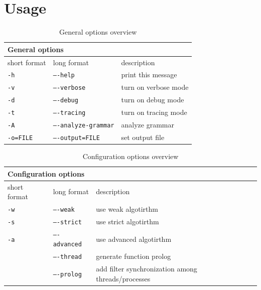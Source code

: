 \section{Usage}

%

\begin{table}[h]
\centering
	\begin{tabular}{||l|l|p{6cm}||}
	\hline
	\multicolumn{3}{||l||}{\textbf{General options}}              \\ \hline\hline
	short format & long format         & description \\ \hline
	\texttt{-h}           & \texttt{----help}              & print this message \\
	\texttt{-v}           & \texttt{----verbose}           & turn on verbose mode \\
	\texttt{-d}           & \texttt{----debug}             & turn on debug mode \\
	\texttt{-t}           & \texttt{----tracing}           & turn on tracing mode \\
	\texttt{-A}           & \texttt{----analyze-grammar} & analyze grammar \\
	\texttt{-o=FILE}      & \texttt{----output=FILE}       &  set output file \\ \hline
	\end{tabular}
	\caption{General options overview}
	\label{my-label}
\end{table}

\begin{table}[h]
\centering
	\begin{tabular}{||l|l|p{6cm}||}
	\hline
	\multicolumn{3}{||l||}{\textbf{Configuration options}}              \\ \hline\hline
	short format & long format         & description \\ \hline
	\texttt{-w}           & \texttt{----weak}         & use weak algotirthm \\
	\texttt{-s}           & \texttt{----strict}       & use strict algotirthm \\
	\texttt{-a}           & \texttt{----advanced}     & use advanced algotirthm \\
	                      & \texttt{----thread}       & generate function prolog \\
	                      & \texttt{----prolog}       & add filter synchronization among threads/processes \\ \hline
	\end{tabular}
	\caption{Configuration options overview}
	\label{my-label}
\end{table}


